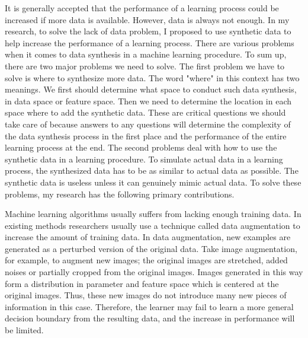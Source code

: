 \documentclass{iitthesis}
\begin{document}
It is generally accepted that the performance of a learning process could be increased if more data is available. However, data is always not enough. In my research, to solve the lack of data problem, I proposed to use synthetic data to help increase the performance of a learning process. There are various problems when it comes to data synthesis in a machine learning procedure. To sum up, there are two major problems we need to solve. The first problem we have to solve is where to synthesize more data. The word "where" in this context has two meanings. We first should determine what space to conduct such data synthesis, in data space or feature space. Then we need to determine the location in each space where to add the synthetic data. These are critical questions we should take care of because answers to any questions will determine the complexity of the data synthesis process in the first place and the performance of the entire learning process at the end. The second problems deal with how to use the synthetic data in a learning procedure. To simulate actual data in a learning process, the synthesized data has to be as similar to actual data as possible. The synthetic data is useless unless it can genuinely mimic actual data. To solve these problems, my research has the following primary contributions.

 Machine learning algorithms usually suffers from lacking enough training data. In existing methods researchers usually use a technique called data augmentation to increase the amount of training data. In data augmentation, new examples are generated as a perturbed version of the original data. Take image augmentation, for example, to augment new images; the original images are stretched, added noises or partially cropped from the original images. Images generated in this way form a distribution in parameter and feature space which is centered at the original images. Thus, these new images do not introduce many new pieces of information in this case. Therefore, the learner may fail to learn a more general decision boundary from the resulting data, and the increase in performance will be limited.
\end{document}
